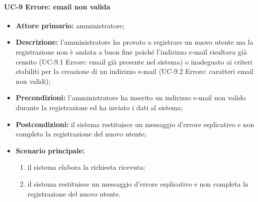 \paragraph{UC-9 Errore: email non valida}
\begin{itemize}
	\item \textbf{Attore primario:} amministratore;

	\item \textbf{Descrizione:} l'amministratore ha provato a registrare un nuovo utente ma la registrazione non è andata a buon fine poiché l'indirizzo e-mail risultava già censito (UC-9.1 Errore: email già presente nel sistema) o inadeguato ai criteri stabiliti per la creazione di un indirizzo e-mail (UC-9.2 Errore: caratteri email non validi);

	\item \textbf{Precondizioni:} l'amministratore ha inserito un indirizzo e-mail non valido durante la registrazione ed ha inviato i dati al sistema;

	\item \textbf{Postcondizioni:} il sistema restituisce un messaggio d'errore esplicativo e non completa la registrazione del nuovo utente;

	\item \textbf{Scenario principale:}
	      \begin{enumerate}
		      \item il sistema elabora la richiesta ricevuta;
		      \item il sistema restituisce un messaggio d'errore esplicativo e non completa la registrazione del nuovo utente.
	      \end{enumerate}
\end{itemize}


